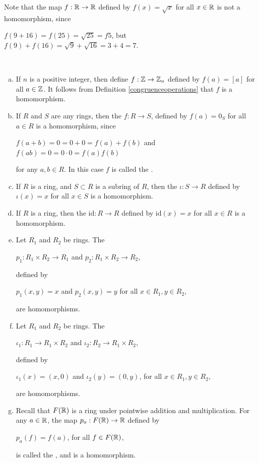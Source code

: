 \documentclass[11pt,fleqn,dvipsnames,usenames]{article}
\newcommand{\p}{\noindent}
\begin{document}
%
\p Note that the map $f:\mathbb{R}\to\mathbb{R}$ defined by $f(x) = \sqrt{x}$ for all $x\in\mathbb{R}$ is not a homomorphism, since
\begin{center}
$f(9 + 16) = f(25) = \sqrt{25} = f5$, but $f(9) + f(16) = \sqrt{9} + \sqrt{16} = 3 + 4 = 7$.
\end{center}
%
\begin{examples}\label{homomorphismexamples}~
\begin{enumerate}[(a)]
\item If $n$ is a positive integer, then define $f:\mathbb{Z}\to\mathbb{Z}_{n}$ defined by $f(a) = [a]$ for all $a\in\mathbb{Z}$.  It follows from Definition \ref{congruenceoperations} that $f$ is a homomorphism.
\item If $R$ and $S$ are any rings, then the  $f:R\to S$, defined by $f(a) = 0_{S}$ for all $a\in R$ is a homomorphism, since
\begin{center}
$f(a + b) = 0 = 0 + 0 = f(a) + f(b)$ and $f(ab) = 0 = 0\cdot 0 = f(a)f(b)$
\end{center}
for any $a,b\in R$.  In this case $f$ is called the .
\item If $R$ is a ring, and $S\subset R$ is a subring of $R$, then the  $\iota:S\to R$ defined by $\iota(x) = x$ for all $x\in S$ is a homomorphism.
\item If $R$ is a ring, then the  $\text{id}:R\to R$ defined by $\text{id}(x) = x$ for all $x\in R$ is a homomorphism.
\item Let $R_1$ and $R_2$ be rings.  The 
\begin{center}
$p_{1}:R_1\times R_2\to R_1$ and $p_2:R_1\times R_2\to R_2$,
\end{center}
defined by
\begin{center}
$p_1(x,y) = x$ and $p_2(x,y) = y$ for all $x\in R_1,y\in R_2$,
\end{center}
are homomorphisms.
\item Let $R_1$ and $R_2$ be rings.  The 
\begin{center}
$\iota_1:R_1\to R_1\times R_2$ and $\iota_2:R_2\to R_1\times R_2$,
\end{center}
defined by
\begin{center}
$\iota_1(x) = (x,0)$ and $\iota_2(y) = (0,y)$, for all $x\in R_1,y\in R_2$,
\end{center}
are homomorphisms.
\item Recall that $F(\mathbb{R})$ is a ring under pointwise addition and multiplication.  For any $a\in \mathbb{R}$, the map $p_{a}:F(\mathbb{R})\to \mathbb{R}$ defined by
\begin{center}
$p_a(f) = f(a)$, for all $f\in F(\mathbb{R})$,
\end{center}
is called the , and is a homomorphism.
\end{enumerate}
\end{examples}
\end{document}
